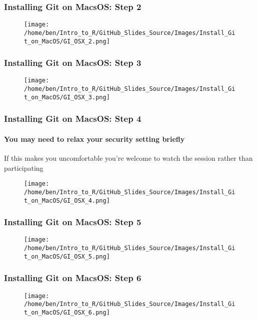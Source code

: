 \documentclass[xcolor=dvipsnames]{beamer}
\begin{document}
\begin{frame}
\frametitle{Installing Git on MacsOS: Step 2}
\begin{center}
\begin{figure}
\texttt{[image: /home/ben/Intro\_to\_R/GitHub\_Slides\_Source/Images/Install\_Git\_on\_MacOS/GI\_OSX\_2.png]}
\end{figure}
\end{center}
\end{frame}

\begin{frame}
\frametitle{Installing Git on MacsOS: Step 3}
\begin{center}
\begin{figure}
\texttt{[image: /home/ben/Intro\_to\_R/GitHub\_Slides\_Source/Images/Install\_Git\_on\_MacOS/GI\_OSX\_3.png]}
\end{figure}
\end{center}
\end{frame}

\begin{frame}
\frametitle{Installing Git on MacsOS: Step 4}
\framesubtitle{You may need to relax your security setting briefly}
If this makes you uncomfortable you're welcome to watch the session rather than participating
\begin{center}
\begin{figure}
\texttt{[image: /home/ben/Intro\_to\_R/GitHub\_Slides\_Source/Images/Install\_Git\_on\_MacOS/GI\_OSX\_4.png]}
\end{figure}
\end{center}
\end{frame}

\begin{frame}
\frametitle{Installing Git on MacsOS: Step 5}
\begin{center}
\begin{figure}
\texttt{[image: /home/ben/Intro\_to\_R/GitHub\_Slides\_Source/Images/Install\_Git\_on\_MacOS/GI\_OSX\_5.png]}
\end{figure}
\end{center}
\end{frame}

\begin{frame}
\frametitle{Installing Git on MacsOS: Step 6}
\begin{center}
\begin{figure}
\texttt{[image: /home/ben/Intro\_to\_R/GitHub\_Slides\_Source/Images/Install\_Git\_on\_MacOS/GI\_OSX\_6.png]}
\end{figure}
\end{center}
\end{frame}
\end{document}
